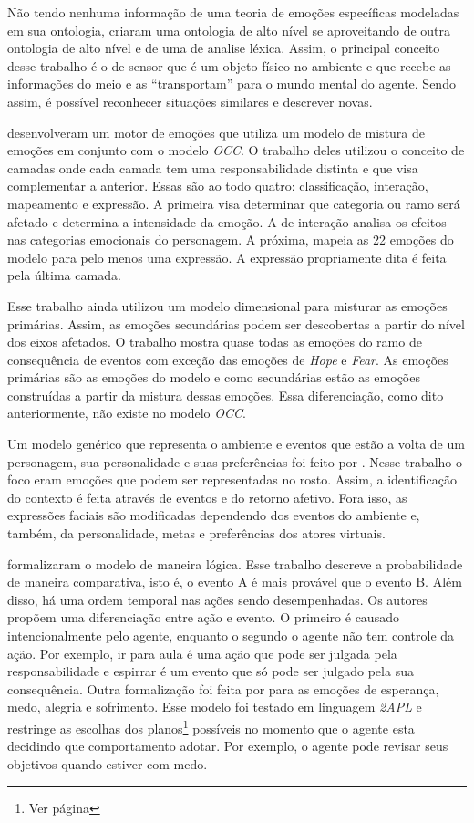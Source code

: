 Não tendo nenhuma informação de uma teoria de emoções específicas modeladas em
sua ontologia, \citet{wks2008towards} criaram uma ontologia de alto nível se
aproveitando de outra ontologia de alto nível e de uma de analise léxica.
Assim, o principal conceito desse trabalho é o de sensor que é um objeto
físico no ambiente e que recebe as informações do meio e as ``transportam''
para o mundo mental do agente. Sendo assim, é possível reconhecer
situações similares e descrever novas.

\citet{springerlink:10.1007/978-3-642-01639-448} desenvolveram um motor de
emoções que utiliza um modelo de mistura de emoções em conjunto com o modelo
\emph{OCC}. O trabalho deles utilizou o conceito de camadas onde cada camada tem uma
responsabilidade distinta e que visa complementar a anterior. Essas são ao todo
quatro: classificação, interação, mapeamento e expressão. A primeira visa
determinar que categoria ou ramo será afetado e determina a
intensidade da emoção. A de interação analisa os efeitos nas categorias
emocionais do personagem. A próxima, mapeia as 22 emoções do modelo para pelo
menos uma expressão. A expressão propriamente dita é feita pela última camada.

Esse trabalho ainda utilizou um modelo dimensional para misturar as emoções
primárias. Assim, as emoções secundárias podem ser descobertas a partir do
nível dos eixos afetados. O trabalho mostra quase todas as emoções do
ramo de consequência de eventos com exceção das emoções de \emph{Hope} e
\emph{Fear}. As emoções primárias são as emoções do modelo \occ e como
secundárias estão as emoções construídas a partir da mistura dessas emoções.
Essa diferenciação, como dito anteriormente, não existe no modelo \emph{OCC}.

Um modelo genérico que representa o ambiente e eventos que estão a volta de um
personagem, sua personalidade e suas preferências foi feito por
\citet{lera2009semantic}. Nesse trabalho o foco eram emoções que podem ser
representadas no rosto. Assim, a identificação do contexto é feita através de
eventos e do retorno afetivo. Fora isso, as expressões faciais são modificadas
dependendo dos eventos do ambiente e, também, da personalidade, metas e
preferências dos atores virtuais.

\citet{adam2009alfototoe} formalizaram o modelo \occ de maneira lógica.
Esse trabalho descreve a probabilidade de maneira comparativa, isto é, o
evento A é mais provável que o evento B. Além disso, há uma ordem temporal nas
ações sendo desempenhadas. Os autores propõem uma diferenciação entre ação e
evento. O primeiro é causado intencionalmente pelo agente\dev{},
enquanto o segundo o agente não tem controle da ação. Por exemplo, ir para
aula é uma ação que pode ser julgada pela responsabilidade e espirrar é um
evento que só pode ser julgado pela sua consequência.
%
Outra formalização foi feita por \citet{steunebrink2010emotions} para as
emoções de esperança, medo, alegria e sofrimento. Esse modelo foi testado em
linguagem \emph{2APL} e restringe as escolhas dos planos\footnote{Ver página
\pageref{plan}} possíveis no momento que o agente esta decidindo que
comportamento adotar. Por exemplo, o agente pode revisar seus objetivos
quando estiver com medo.

